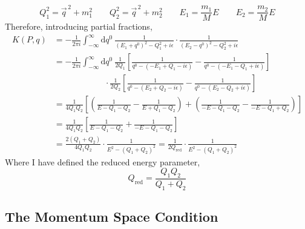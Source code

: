 \documentclass[12pt]{article}
\renewcommand{\d}[1]{ \mathrm{d}#1 \:}
\begin{document}
\begin{equation}
Q_1^2 = \vec{q}^{\, 2} + m_1^2 \quad \quad Q_2^2 = \vec{q}^{\, 2} + m_2^2 \quad \quad E_1 = \frac{m_1}{M} E \quad \quad E_2 = \frac{m_2}{M} E
\end{equation}
Therefore, introducing partial fractions,
\begin{subequations}
\begin{align}
K(P, q) & = -\frac{1}{2 \pi i} \int_{-\infty}^{\infty} \d{q^0} \frac{1}{(E_1 + q^0)^2 - Q_1^2 + i \epsilon} \cdot \frac{1}{(E_2 - q^0)^2 - Q_2^2 + i \epsilon}
\\
& = -\frac{1}{2 \pi i} \int_{-\infty}^{\infty} \d{q^0} \frac{1}{2 Q_1} \left[ \frac{1}{q^0 - (-E_1 + Q_1 - i \epsilon )} - \frac{1}{q^0 - (-E_1 - Q_1 + i \epsilon)} \right]
\\
& \quad \quad \quad \quad \quad \quad \cdot \frac{1}{2 Q_2} \left[ \frac{1}{q^0 - (E_2 + Q_2 - i \epsilon)} - \frac{1}{q^0 - (E_2 - Q_2 + i \epsilon)} \right]
\\
& = \frac{1}{4 Q_1 Q_2} \left[ \left( \frac{1}{E - Q_1 - Q_2} - \frac{1}{E + Q_1 - Q_2} \right) + \left( \frac{1}{-E - Q_1 - Q_2} - \frac{1}{-E - Q_1 + Q_2} \right) \right] 
\\
& = \frac{1}{4 Q_1 Q_2} \left[ \frac{1}{E - Q_1 - Q_2} +  \frac{1}{-E - Q_1 - Q_2}  \right] 
\\
& = \frac{2(Q_1 + Q_2)}{4 Q_1 Q_2} \cdot \frac{1}{E^2 - (Q_1 + Q_2)^2} = \frac{1}{2 Q_{\mathrm{red}}} \cdot \frac{1}{E^2 - (Q_1 + Q_2)^2} 
\end{align}
\end{subequations}
Where I have defined the reduced energy parameter,
\begin{equation}
Q_{\mathrm{red}} = \frac{Q_1 Q_2}{Q_1 + Q_2} 
\end{equation}

\subsection{The Momentum Space Condition}
\end{document}
